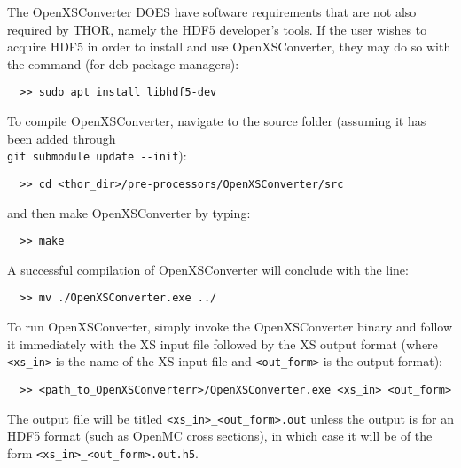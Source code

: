 The OpenXSConverter DOES have software requirements that are not also required by \ac{THOR}, namely the HDF5 developer's tools.
If the user wishes to acquire HDF5 in order to install and use OpenXSConverter, they may do so with the command (for deb package managers):
\begin{verbatim}
  >> sudo apt install libhdf5-dev
\end{verbatim}
To compile OpenXSConverter, navigate to the source folder (assuming it has been added through \\
\verb"git submodule update --init"):
\begin{verbatim}
  >> cd <thor_dir>/pre-processors/OpenXSConverter/src
\end{verbatim}
and then make OpenXSConverter by typing:
\begin{verbatim}
  >> make
\end{verbatim}
A successful compilation of OpenXSConverter will conclude with the line:
\begin{verbatim}
  >> mv ./OpenXSConverter.exe ../
\end{verbatim}

To run OpenXSConverter, simply invoke the OpenXSConverter binary and follow it immediately with the XS input file followed by the XS output format (where \verb"<xs_in>" is the name of the XS input file and \verb"<out_form>" is the output format):
\begin{verbatim}
  >> <path_to_OpenXSConverterr>/OpenXSConverter.exe <xs_in> <out_form>
\end{verbatim}
The output file will be titled \verb"<xs_in>_<out_form>.out" unless the output is for an HDF5 format (such as OpenMC cross sections), in which case it will be of the form \verb"<xs_in>_<out_form>.out.h5".

